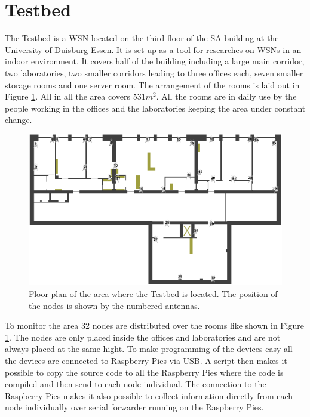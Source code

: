 \section{Testbed}
The Testbed is a WSN located on the third floor of the SA building at the University of Duisburg-Essen. It is set up as a tool for researches on WSNs in an indoor environment. It covers half of the building including a large main corridor, two laboratories, two smaller corridors leading to three offices each, seven smaller storage rooms and one server room. The arrangement of the rooms is laid out in Figure \ref{fig:testbed}. All in all the area covers $531m^2$. All the rooms are in daily use by the people working in the offices and the laboratories keeping the area under constant change.

\begin{figure}[htbp]
	\centering
    \includegraphics[scale=0.75]{content/images/Testbed}
   	\caption{Floor plan of the area where the Testbed is located. The position of the nodes is shown by the numbered antennas.}
    \label{fig:testbed}
\end{figure}

To monitor the area 32 nodes are distributed over the rooms like shown in Figure \ref{fig:testbed}. The nodes are only placed inside the offices and laboratories and are not always placed at the same hight. To make programming of the devices easy all the devices are connected to Raspberry Pies via USB. A script then makes it possible to copy the source code to all the Raspberry Pies where the code is compiled and then send to each node individual. The connection to the Raspberry Pies makes it also possible to collect information directly from each node individually over serial forwarder running on the Raspberry Pies.

